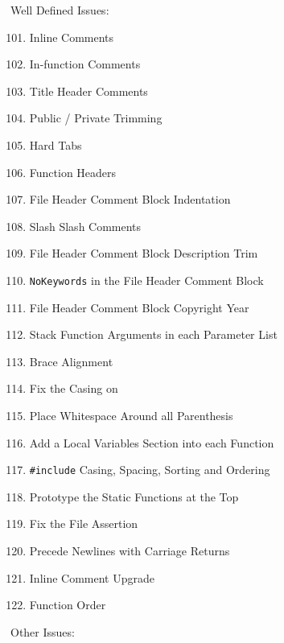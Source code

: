 \documentclass[11pt]{scrreprt}
\begin{document}
Well Defined Issues:
\begin{enumerate}
	\setcounter{enumi}{100}
	\item Inline Comments
	\item In-function Comments
	\item Title Header Comments
	\item Public / Private Trimming
	\item Hard Tabs
	\item Function Headers
	\item File Header Comment Block Indentation
	\item Slash Slash Comments
	\item File Header Comment Block Description Trim
	\item \texttt{NoKeywords} in the File Header Comment Block
	\item File Header Comment Block Copyright Year
	\item Stack Function Arguments in each Parameter List
	\item Brace Alignment
	\item Fix the Casing on
	\item Place Whitespace Around all Parenthesis
	\item Add a Local Variables Section into each Function
	\item \texttt{\#include} Casing, Spacing, Sorting and Ordering
	\item Prototype the Static Functions at the Top
	\item Fix the File Assertion
	\item Precede Newlines with Carriage Returns
	\item Inline Comment Upgrade
	\item Function Order
\end{enumerate}
Other Issues:
\end{document}
